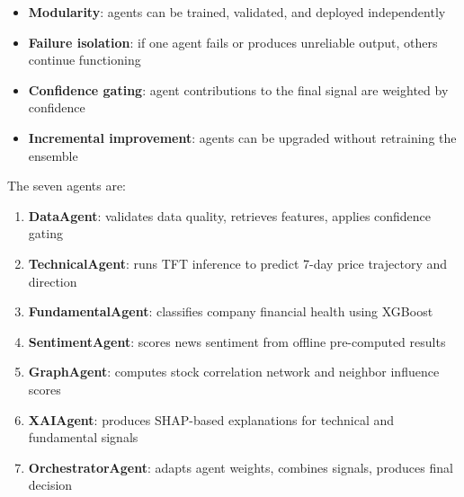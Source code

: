 \documentclass[conference]{IEEEtran}
\begin{document}
\begin{itemize}
\item \textbf{Modularity}: agents can be trained, validated, and deployed independently
\item \textbf{Failure isolation}: if one agent fails or produces unreliable output, others continue functioning
\item \textbf{Confidence gating}: agent contributions to the final signal are weighted by confidence
\item \textbf{Incremental improvement}: agents can be upgraded without retraining the ensemble
\end{itemize}

The seven agents are:
\begin{enumerate}
\item \textbf{DataAgent}: validates data quality, retrieves features, applies confidence gating
\item \textbf{TechnicalAgent}: runs TFT inference to predict 7-day price trajectory and direction
\item \textbf{FundamentalAgent}: classifies company financial health using XGBoost~\cite{ref:xgboost}
\item \textbf{SentimentAgent}: scores news sentiment from offline pre-computed results
\item \textbf{GraphAgent}: computes stock correlation network and neighbor influence scores
\item \textbf{XAIAgent}: produces SHAP-based explanations for technical and fundamental signals
\item \textbf{OrchestratorAgent}: adapts agent weights, combines signals, produces final decision
\end{enumerate}
\end{document}
